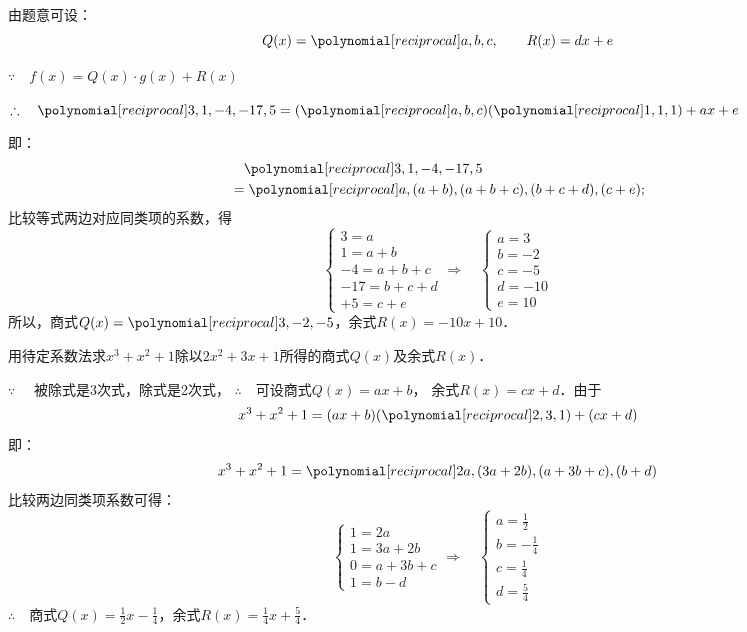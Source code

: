 \begin{solution}
    由题意可设：
\[Q(x)=\poly{a,b,c},\qquad R(x)=dx+e\]

$\because\quad f(x)=Q(x)\cdot g(x)+R(x)$   

$\therefore\quad \poly{3,1,-4,-17,5}=(\poly{a,b,c})(\poly{1,1,1})+ax+e$

即：
\[\begin{split}
    &\quad \poly{3,1,-4,-17,5}\\
    &=\poly{a,(a+b),(a+b+c),(b+c+d),(c+e)};
\end{split}\] 
比较等式两边对应同类项的系数，得
\[\begin{cases}
    3=a\\
    1=a+b\\
    -4=a+b+c\\
    -17=b+c+d\\
    +5=c+e
\end{cases}\Rightarrow\quad  \begin{cases}
    a=3\\
    b=-2\\
    c=-5\\
    d=-10\\
    e=10
\end{cases}\]
所以，商式$Q(x)=\poly{3,-2,-5}$，余式$R(x)=-10x+10$．
\end{solution}

\begin{example}
    用待定系数法求$x^3+x^2+1$除以$2x^2+3x+1$所得的商式$Q(x)$及余式$R(x)$．
\end{example}

\begin{solution}
$\because\quad $ 被除式是3次式，除式是2次式，
$\therefore\quad $可设商式$Q(x)=ax+b$，
余式$R(x)=cx+d$．由于
\[x^3+x^2+1=(ax+b)(\poly{2,3,1})+(cx+d)\]
即：
\[x^3+x^2+1=\poly{2a, (3a+2b), (a+3b+c), (b+d)}\]
比较两边同类项系数可得：
\[\begin{cases}
  1=2a\\
  1=3a+2b\\
  0=a+3b+c\\
  1=b-d  
\end{cases}\Rightarrow\quad \begin{cases}
    a=\frac{1}{2}\\
    b=-\frac{1}{4}\\
    c=\frac{1}{4}\\
    d=\frac{5}{4}
\end{cases}\]
$\therefore\quad $商式$Q(x)=\frac{1}{2}x-\frac{1}{4}$，余式$R(x)=\frac{1}{4}x+\frac{5}{4}$．
\end{solution}

